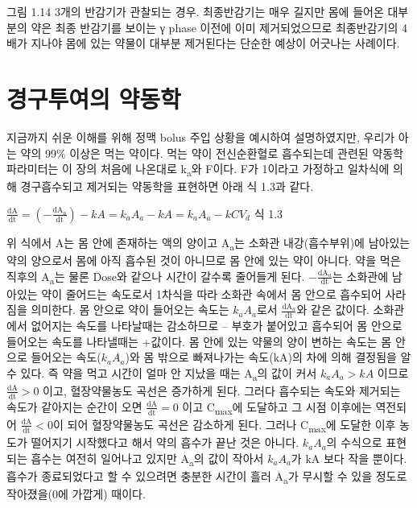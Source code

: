 \documentclass[
  11pt,
  krantz2, a4paper, twoside]{krantz}
\begin{document}
그림 1.14 3개의 반감기가 관찰되는 경우. 최종반감기는 매우 길지만 몸에
들어온 대부분의 약은 최종 반감기를 보이는 γ phase 이전에 이미
제거되었으므로 최종반감기의 4배가 지나야 몸에 있는 약물이 대부분
제거된다는 단순한 예상이 어긋나는 사례이다.

\hypertarget{uxacbduxad6cuxd22cuxc5ecuxc758-uxc57duxb3d9uxd559}{%
\section{경구투여의 약동학}\label{uxacbduxad6cuxd22cuxc5ecuxc758-uxc57duxb3d9uxd559}}

지금까지 쉬운 이해를 위해 정맥 bolus 주입 상황을 예시하여 설명하였지만,
우리가 아는 약의 99\% 이상은 먹는 약이다. 먹는 약이 전신순환혈로
흡수되는데 관련된 약동학 파라미터는 이 장의 처음에 나온대로 k\textsubscript{a}와
F이다. F가 1이라고 가정하고 일차식에 의해 경구흡수되고 제거되는 약동학을
표현하면 아래 식 1.3과 같다.

\(\frac{\text{dA}}{\text{dt}} = \left( - \frac{\text{dA}_{a}}{\text{dt}} \right) - kA = k_{a}A_{a} - kA = k_{a}A_{a} - kCV_{d}\)
식 1.3

위 식에서 A는 몸 안에 존재하는 액의 양이고 A\textsubscript{a}는 소화관
내강(흡수부위)에 남아있는 약의 양으로서 몸에 아직 흡수된 것이 아니므로
몸 안에 있는 약이 아니다. 약을 먹은 직후의 A\textsubscript{a}는 물론 Dose와 같으나
시간이 갈수록 줄어들게 된다. \(- \frac{\text{dA}_{a}}{\text{dt}}\)는
소화관에 남아있는 약이 줄어드는 속도로서 1차식을 따라 소화관 속에서 몸
안으로 흡수되어 사라짐을 의미한다. 몸 안으로 약이 들어오는 속도는
\(k_{a}A_{a}\)로서 \(\frac{\text{dA}_{a}}{\text{dt}}\)와 같은 값이다.
소화관에서 없어지는 속도를 나타날때는 감소하므로 -- 부호가 붙어있고
흡수되어 몸 안으로 들어오는 속도를 나타낼때는 +값이다. 몸 안에 있는
약물의 양이 변하는 속도는 몸 안으로 들어오는 속도(\(k_{a}A_{a}\))와 몸
밖으로 빠져나가는 속도(\(\text{kA}\))의 차에 의해 결정됨을 알 수 있다. 즉
약을 먹고 시간이 얼마 안 지났을 때는 A\textsubscript{a}의 값이 커서 \(k_{a}A_{a} > kA\)
이므로 \(\frac{\text{dA}}{\text{dt}} > 0\) 이고, 혈장약물농도 곡선은
증가하게 된다. 그러다 흡수되는 속도와 제거되는 속도가 같아지는 순간이
오면 \(\frac{\text{dA}}{\text{dt}} = 0\) 이고 C\textsubscript{max}에 도달하고 그 시점
이후에는 역전되어 \(\frac{\text{dA}}{\text{dt}} < 0\)이 되어 혈장약물농도
곡선은 감소하게 된다. 그러나 C\textsubscript{max}에 도달한 이후 농도가 떨어지기
시작했다고 해서 약의 흡수가 끝난 것은 아니다. \(k_{a}A_{a}\)의 수식으로
표현되는 흡수는 여전히 일어나고 있지만 A\textsubscript{a}의 값이 작아서 \(k_{a}A_{a}\)가
\(\text{kA}\) 보다 작을 뿐이다. 흡수가 종료되었다고 할 수 있으려면 충분한
시간이 흘러 A\textsubscript{a}가 무시할 수 있을 정도로 작아졌을(0에 가깝게) 때이다.
\end{document}
